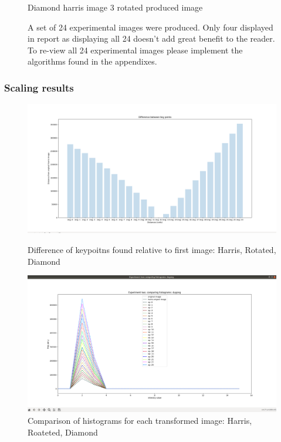\documentclass[conference]{IEEEtran}
\begin{document}
\begin{figure}[!htb]
\begin{minipage}[b]{0.2\textwidth}
    \caption{Diamond harris image 3 rotated produced image}
    \label{Diamond harris image 3 rotated produced image}
  \end{minipage}
  {\caption*{A set of 24 experimental images were produced. Only four displayed in report as displaying all 24 doesn't add great benefit to the reader. To re-view all 24 experimental images please implement the algorithms found in the appendixes.}}
\end{figure}

\subsubsection{Scaling results}

\begin{figure}[!htb]
  \centering
  \begin{minipage}[t]{0.45\textwidth}
    \includegraphics[width=\textwidth]{../programme/results/Task_1/scaled_experiements/Harris/dugong/diff between keypoints found.png}
    \caption{Difference of keypoitns found relative to first image: Harris, Rotated, Diamond}
    \label{Difference of keypoitns found relative to first image: Harris, Rotated, Diamond}
  \end{minipage}
  \hfill
  \begin{minipage}[t]{0.45\textwidth}
    \includegraphics[width=\textwidth]{../programme/results/Task_1/scaled_experiements/Harris/dugong/hists.png}
    \caption{Comparison of histograms for each transformed image: Harris, Roateted, Diamond}
    \label{Comparison of histograms for each transformed image: Harris, Roateted, Diamond}
  \end{minipage}
\end{figure}
\end{document}
